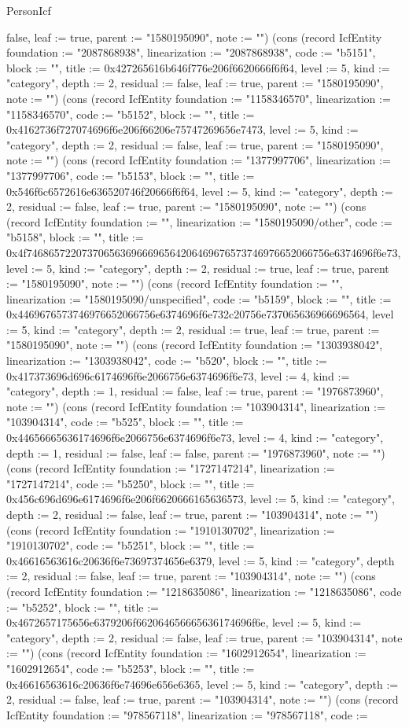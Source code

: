 \begin{lexlean}{PersonIcf}
\begin{semanticmodule}
{false, leaf := true, parent := "1580195090", note := ""}) (cons (record IcfEntity {foundation := "2087868938", linearization := "2087868938", code := "b5151", block := "", title := 0x427265616b646f776e206f6620666f6f64, level := 5, kind := "category", depth := 2, residual := false, leaf := true, parent := "1580195090", note := ""}) (cons (record IcfEntity {foundation := "1158346570", linearization := "1158346570", code := "b5152", block := "", title := 0x4162736f727074696f6e206f66206e75747269656e7473, level := 5, kind := "category", depth := 2, residual := false, leaf := true, parent := "1580195090", note := ""}) (cons (record IcfEntity {foundation := "1377997706", linearization := "1377997706", code := "b5153", block := "", title := 0x546f6c6572616e636520746f20666f6f64, level := 5, kind := "category", depth := 2, residual := false, leaf := true, parent := "1580195090", note := ""}) (cons (record IcfEntity {foundation := "", linearization := "1580195090/other", code := "b5158", block := "", title := 0x4f7468657220737065636966696564206469676573746976652066756e6374696f6e73, level := 5, kind := "category", depth := 2, residual := true, leaf := true, parent := "1580195090", note := ""}) (cons (record IcfEntity {foundation := "", linearization := "1580195090/unspecified", code := "b5159", block := "", title := 0x4469676573746976652066756e6374696f6e732c20756e737065636966696564, level := 5, kind := "category", depth := 2, residual := true, leaf := true, parent := "1580195090", note := ""}) (cons (record IcfEntity {foundation := "1303938042", linearization := "1303938042", code := "b520", block := "", title := 0x417373696d696c6174696f6e2066756e6374696f6e73, level := 4, kind := "category", depth := 1, residual := false, leaf := true, parent := "1976873960", note := ""}) (cons (record IcfEntity {foundation := "103904314", linearization := "103904314", code := "b525", block := "", title := 0x44656665636174696f6e2066756e6374696f6e73, level := 4, kind := "category", depth := 1, residual := false, leaf := false, parent := "1976873960", note := ""}) (cons (record IcfEntity {foundation := "1727147214", linearization := "1727147214", code := "b5250", block := "", title := 0x456c696d696e6174696f6e206f6620666165636573, level := 5, kind := "category", depth := 2, residual := false, leaf := true, parent := "103904314", note := ""}) (cons (record IcfEntity {foundation := "1910130702", linearization := "1910130702", code := "b5251", block := "", title := 0x46616563616c20636f6e73697374656e6379, level := 5, kind := "category", depth := 2, residual := false, leaf := true, parent := "103904314", note := ""}) (cons (record IcfEntity {foundation := "1218635086", linearization := "1218635086", code := "b5252", block := "", title := 0x4672657175656e6379206f662064656665636174696f6e, level := 5, kind := "category", depth := 2, residual := false, leaf := true, parent := "103904314", note := ""}) (cons (record IcfEntity {foundation := "1602912654", linearization := "1602912654", code := "b5253", block := "", title := 0x46616563616c20636f6e74696e656e6365, level := 5, kind := "category", depth := 2, residual := false, leaf := true, parent := "103904314", note := ""}) (cons (record IcfEntity {foundation := "978567118", linearization := "978567118", code := }
\end{semanticmodule}
\end{lexlean}
